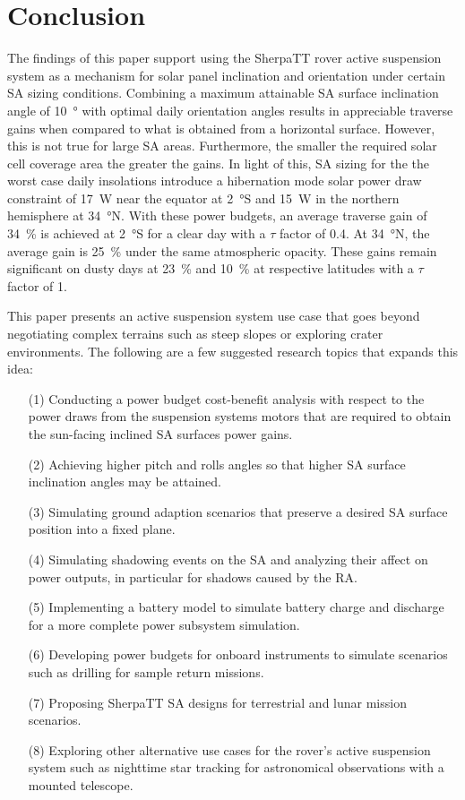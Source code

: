 \documentclass[twocolumn,letterpaper]{IEEEAerospaceCLS}  %
\begin{document}
\section{Conclusion}
The findings of this paper support using the SherpaTT rover active suspension system as a mechanism for solar panel inclination and orientation under certain \ac{SA} sizing conditions. Combining a maximum attainable \ac{SA} surface inclination angle of \SI{10}{\degree} with optimal daily orientation angles results in appreciable traverse gains when compared to what is obtained from a horizontal surface. However, this is not true for large \ac{SA} areas. Furthermore, the smaller the required solar cell coverage area the greater the gains. In light of this, \ac{SA} sizing for the the worst case daily insolations introduce a hibernation mode solar power draw constraint of \SI{17}{\watt} near the equator at \SI{2}{\degree}S and \SI{15}{\watt} in the northern hemisphere at \SI{34}{\degree}N. With these power budgets, an average traverse gain of \SI{34}{\percent} is achieved at \SI{2}{\degree}S for a clear day with a $\tau$ factor of 0.4. At \SI{34}{\degree}N, the average gain is \SI{25}{\percent} under the same atmospheric opacity. These gains remain significant on dusty days at \SI{23}{\percent} and \SI{10}{\percent} at respective latitudes with a $\tau$ factor of 1.

This paper presents an active suspension system use case that goes beyond negotiating complex terrains such as steep slopes or exploring crater environments. The following are a few suggested research topics that expands this idea:

\begin{itemize}
  \item [(1)] Conducting a power budget cost-benefit analysis with respect to the power draws from the suspension systems motors that are required to obtain the sun-facing inclined \ac{SA} surfaces power gains.
  \item [(2)] Achieving higher pitch and rolls angles so that higher \ac{SA} surface inclination angles may be attained.
  \item [(3)] Simulating ground adaption scenarios that preserve a desired \ac{SA} surface position into a fixed plane.
  \item [(4)] Simulating shadowing events on the \ac{SA} and analyzing their affect on power outputs, in particular for shadows caused by the \ac{RA}.
  \item [(5)] Implementing a battery model to simulate battery charge and discharge for a more complete power subsystem simulation.
  \item [(6)] Developing power budgets for onboard instruments to simulate scenarios such as drilling for sample return missions.
  \item [(7)] Proposing SherpaTT \ac{SA} designs for terrestrial and lunar mission scenarios.
  \item [(8)] Exploring other alternative use cases for the rover's active suspension system such as nighttime star tracking for astronomical observations with a mounted telescope.
\end{itemize}
\end{document}
